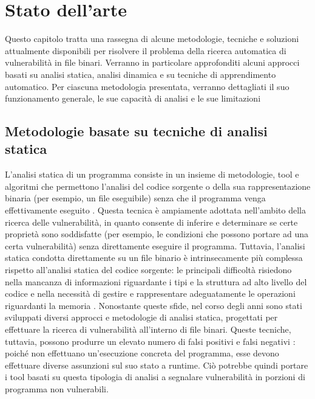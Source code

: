\documentclass[../main.tex]{subfiles}
\begin{document}
\chapter{Stato dell'arte}
\label{chap:related}
Questo capitolo tratta una rassegna di alcune metodologie, tecniche e soluzioni attualmente disponibili per risolvere il problema della ricerca automatica di vulnerabilità in file binari.
Verranno in particolare approfonditi alcuni approcci basati su analisi statica, analisi dinamica e su tecniche di apprendimento automatico.
Per ciascuna metodologia presentata, verranno dettagliati il suo funzionamento generale, le sue capacità di analisi e le sue limitazioni

\section{Metodologie basate su tecniche di analisi statica}
L'analisi statica di un programma consiste in un insieme di metodologie, tool e algoritmi che permettono l'analisi del codice sorgente o della
sua rappresentazione binaria (per esempio, un file eseguibile) senza che il programma venga effettivamente eseguito \cite{static_analysis_introduction}.
Questa tecnica è ampiamente adottata nell'ambito della ricerca delle vulnerabilità, in quanto consente di inferire e determinare se
certe proprietà sono soddisfatte (per esempio, le condizioni che possono portare ad una certa vulnerabilità) senza direttamente eseguire il programma.
Tuttavia, l'analisi statica condotta direttamente su un file binario è intrinsecamente più complessa rispetto all'analisi statica del codice sorgente:
le principali difficoltà risiedono nella mancanza di informazioni riguardante i tipi e la struttura ad alto livello del codice \cite{Review_of_static_analysis} e nella necessità di gestire e rappresentare adeguatamente le operazioni riguardanti la memoria \cite{CodeSurfer}.
Nonostante queste sfide, nel corso degli anni sono stati sviluppati diversi approcci e metodologie di analisi statica, progettati per effettuare la ricerca di vulnerabilità all'interno di file binari.
Queste tecniche, tuttavia, possono produrre un elevato numero di falsi positivi e falsi negativi : poiché non effettuano un'esecuzione concreta del programma,
esse devono effettuare diverse assunzioni sul suo stato a runtime. Ciò potrebbe quindi portare i tool basati su questa tipologia di analisi a segnalare vulnerabilità in porzioni di programma non vulnerabili.
\end{document}
